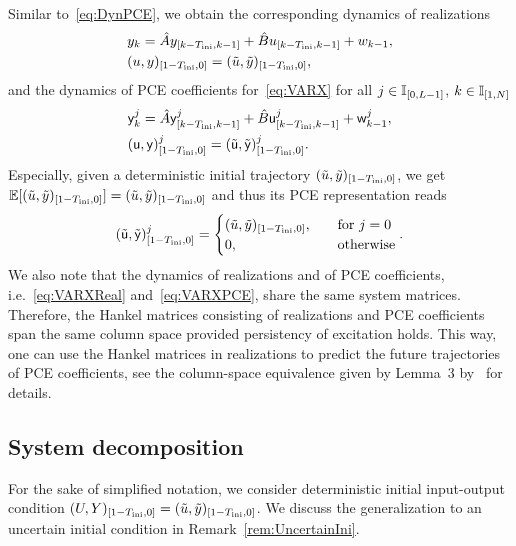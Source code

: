 Similar to~\eqref{eq:DynPCE}, we obtain the corresponding dynamics of realizations
\begin{subequations} \label{eq:VARXReal}
	\begin{align}
		&y_k = \hat{A}y_{[k-T_\text{ini},k-1]} + \hat{B}u_{[k-T_\text{ini},k-1]} + w_{k-1},\\
		&(u,y)_{[1-T_\text{ini},0]} = (\tilde{u},\tilde{y})_{[1-T_\text{ini},0]},
	\end{align}
\end{subequations}
and the dynamics of PCE coefficients for~\eqref{eq:VARX} for all $j\in\mathbb{I}_{[0,L-1]}$, $k\in\mathbb{I}_{[1,N]}$
\begin{subequations} \label{eq:VARXPCE}
	\begin{align}
		&\mathsf{y}_k^j = \hat{A}\mathsf{y}^j_{[k-T_\text{ini},k-1]} + \hat{B}\mathsf{u}^j_{[k-T_\text{ini},k-1]} + \mathsf{w}^j_{k-1},\\
		&(\mathsf{u},\mathsf{y})^j_{[1-T_\text{ini},0]} = (\tilde{\mathsf{u}},\tilde{\mathsf{y}})^j_{[1-T_\text{ini},0]}.
	\end{align}
\end{subequations}
Especially, given a deterministic initial trajectory $(\tilde{u},\tilde{y})_{[1-T_\text{ini},0]}$, we get $\mathbb{E}[(\tilde{u},\tilde{y})_{[1-T_\text{ini},0]}]=(\tilde{u},\tilde{y})_{[1-T_\text{ini},0]}$ and thus its PCE representation reads
\begin{align*}
	(\tilde{\mathsf{u}},\tilde{\mathsf{y}})^j_{[1-T_\text{ini},0]} = \begin{cases}
		(\tilde{u},\tilde{y})_{[1-T_\text{ini},0]},\quad &\text{for } j=0\\
		0,&\text{otherwise}
	\end{cases}.
\end{align*}
We also note that the dynamics of realizations and of PCE coefficients, i.e.~\eqref{eq:VARXReal} and~\eqref{eq:VARXPCE}, share the same system matrices. Therefore, the Hankel matrices consisting of realizations and PCE coefficients span the same column space provided persistency of excitation holds. This way, one can use the Hankel matrices in realizations to predict the future trajectories of PCE coefficients, see the column-space equivalence given by Lemma~3 by~\citet{pan23stochastic} for details.

\subsection{System decomposition}
For the sake of simplified notation, we consider deterministic initial input-output condition $(U,Y)_{[1-T_\text{ini},0]}=(\tilde{u},\tilde{y})_{[1-T_\text{ini},0]}$. We discuss the generalization to an uncertain initial condition in Remark~\ref{rem:UncertainIni}.
	
